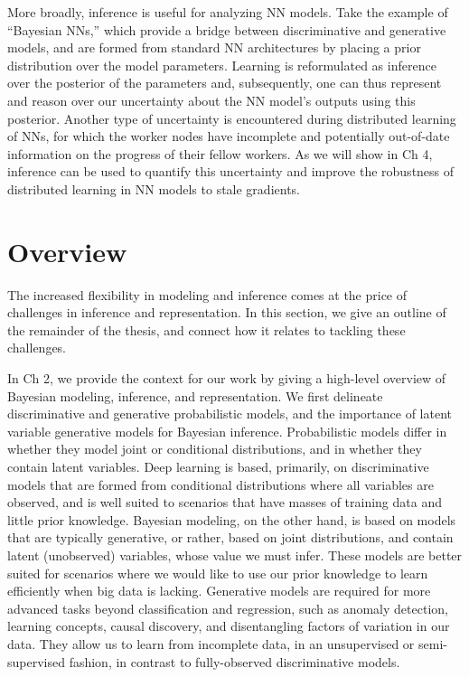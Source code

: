 More broadly, inference is useful for analyzing NN models. Take the example of ``Bayesian NNs,'' which provide a bridge between discriminative and generative models, and are formed from standard NN architectures by placing a prior distribution over the model parameters. Learning is reformulated as inference over the posterior of the parameters and, subsequently, one can thus represent and reason over our uncertainty about the NN model's outputs using this posterior. Another type of uncertainty is encountered during distributed learning of NNs, for which the worker nodes have incomplete and potentially out-of-date information on the progress of their fellow workers. As we will show in Ch 4, inference can be used to quantify this uncertainty and improve the robustness of distributed learning in NN models to stale gradients.

\section{Overview}
The increased flexibility in modeling and inference comes at the price of challenges in inference and representation. In this section, we give an outline of the remainder of the thesis, and connect how it relates to tackling these challenges.

In Ch 2, we provide the context for our work by giving a high-level overview of Bayesian modeling, inference, and representation. We first delineate discriminative and generative probabilistic models, and the importance of latent variable generative models for Bayesian inference. Probabilistic models differ in whether they model joint or conditional distributions, and in whether they contain latent variables. Deep learning is based, primarily, on discriminative models that are formed from conditional distributions where all variables are observed, and is well suited to scenarios that have masses of training data and little prior knowledge. Bayesian modeling, on the other hand, is based on models that are typically generative, or rather, based on joint distributions, and contain latent (unobserved) variables, whose value we must infer. These models are better suited for scenarios where we would like to use our prior knowledge to learn efficiently when big data is lacking. Generative models are required for more advanced tasks beyond classification and regression, such as anomaly detection, learning concepts, causal discovery, and disentangling factors of variation in our data. They allow us to learn from incomplete data, in an unsupervised or semi-supervised fashion, in contrast to fully-observed discriminative models.

